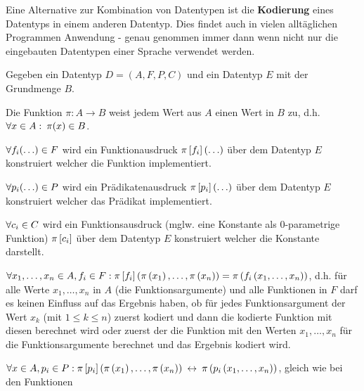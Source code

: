 {\begin{comment}
\[\I{E}{\delta,\omega'}{nth(x,y)} = \ebr{}\]
Was das geforderte Ergebnis für diesen Fall ist.
\item Fall $\abs{\omega'(\tu{x})} \geq \omega'(\tu{y})$:
\[\I{E}{\delta,\omega'}{nth(x,y)} = \ell'_{\omega'(\tu{y})} = \ell'_{n} = \ell_{n+1}\]
Was ebenfalls das geforderte Ergebnis für diesen Fall ist.
\end{\whichitem}
\end{\whichitem}
Damit ist der Beweis erbracht. Wir stellen fest, dass Beweise von $\lng{E}$-Programmen oft kürzer sind als
die Interpretation für einen bestimmten Eingabewert.
\end{bsp}
\ifthenelse{\boolean{long}}{}{\end{comment}}

Eine Alternative zur Kombination von Datentypen ist die \textbf{Kodierung} eines Datentyps in einem anderen Datentyp.
Dies findet auch in vielen alltäglichen Programmen Anwendung - genau genommen immer dann wenn nicht nur die eingebauten Datentypen einer Sprache verwendet werden.

\begin{defn}
Gegeben ein Datentyp $D=(A,F,P,C)$ und ein Datentyp $E$ mit der Grundmenge $B$.
\begin{\whichitem}
\item Die Funktion $\pi: A \to B$ weist jedem Wert aus $A$ einen Wert in $B$ zu, d.h. $\text{$\forall$} x \in A: \: \pi(x) \in B$.
\item $\text{$\forall$} f_i(\ldots) \in F$ wird ein Funktionausdruck $\pi\left[f_i\right](\ldots)$ über dem Datentyp $E$ konstruiert welcher die Funktion implementiert.
\item $\text{$\forall$} p_i(\ldots) \in P$ wird ein Prädikatenausdruck $\pi\left[p_i\right](\ldots)$ über dem Datentyp $E$ konstruiert welcher das Prädikat implementiert.
\item $\text{$\forall$} c_i \in C$ wird ein Funktionsausdruck (mglw. eine Konstante als 0-parametrige Funktion) $\pi\left[c_i\right]$ über dem Datentyp $E$ konstruiert welcher die Konstante darstellt.
\end{\whichitem}
\end{defn}

\begin{defn}[Kodierungseigenschaften] \quad
\begin{\whichitem}
\item $\text{$\forall$} x_1,\ldots,x_n \in A, f_i \in F: \pi\left[f_i\right]\left(\pi\left(x_1\right),\ldots,\pi\left(x_n\right)\right) = \pi\left(f_i\left(x_1,\ldots,x_n\right)\right)$, d.h.
für alle Werte $x_1,\ldots,x_n$ in $A$ (die Funktionsargumente) und alle Funktionen in $F$ darf es keinen Einfluss auf das Ergebnis haben,
ob für jedes Funktionsargument der Wert $x_k$ (mit $1 \leq k \leq n$) zuerst kodiert und dann die kodierte Funktion mit diesen berechnet wird
oder zuerst der die Funktion mit den Werten $x_1,\ldots,x_n$ für die Funktionsargumente berechnet und das Ergebnis kodiert wird.
\item $\text{$\forall$} x \in A, p_i \in P: \pi\left[p_i\right]\left(\pi\left(x_1\right),\ldots,\pi\left(x_n\right)\right) \:\leftrightarrow\: \pi\left(p_i\left(x_1,\ldots,x_n\right)\right)$, gleich wie bei den Funktionen
\end{\whichitem}
\end{defn}

